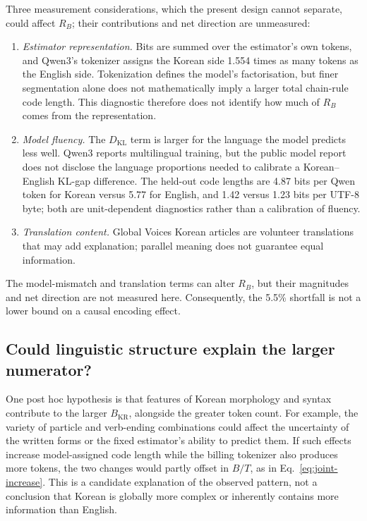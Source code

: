 \documentclass[11pt,a4paper]{article}
\newcommand{\RB}{R_{B}}
\newcommand{\ko}{\mathrm{KR}}
\begin{document}
Three measurement considerations, which the present design cannot separate,
could affect $\RB$; their contributions and net direction are unmeasured:

\begin{enumerate}[nosep]
\item \emph{Estimator representation.} Bits are summed over the estimator's
own tokens, and Qwen3's tokenizer assigns the Korean side 1.554 times as many
tokens as the English side. Tokenization defines the model's factorisation,
but finer segmentation alone does not mathematically imply a larger total
chain-rule code length. This diagnostic therefore does not identify how much
of $\RB$ comes from the representation.
\item \emph{Model fluency.} The $D_{\mathrm{KL}}$ term is larger for the
language the model predicts less well. Qwen3 reports multilingual training,
but the public model report does not disclose the language proportions
needed to calibrate a Korean--English KL-gap difference. The
held-out code lengths are 4.87 bits per Qwen token for Korean versus 5.77
for English, and 1.42 versus 1.23 bits per UTF-8 byte; both are
unit-dependent diagnostics rather than a calibration of fluency.
\item \emph{Translation content.} Global Voices Korean articles are
volunteer translations that may add explanation; parallel meaning does not
guarantee equal information.
\end{enumerate}

The model-mismatch and translation terms can alter $\RB$, but their
magnitudes and net direction are not measured here. Consequently, the 5.5\%
shortfall is not a lower bound on a causal encoding effect.

\subsection{Could linguistic structure explain the larger numerator?}
\label{sec:structural-hypothesis}

One post hoc hypothesis is that features of Korean morphology and syntax
contribute to the larger $B_\ko$, alongside the greater token count. For
example, the variety of particle and verb-ending combinations could affect
the uncertainty of the written forms or the fixed estimator's ability to
predict them. If such effects increase model-assigned code length while the
billing tokenizer also produces more tokens, the two changes would partly
offset in $B/T$, as in Eq.~\ref{eq:joint-increase}. This is a candidate
explanation of the observed pattern, not a conclusion that Korean is
globally more complex or inherently contains more information than English.
\end{document}
